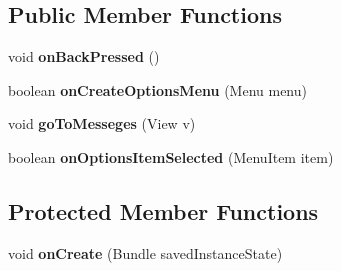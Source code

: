 \subsection*{Public Member Functions}
\begin{DoxyCompactItemize}
\item 
void {\bfseries on\+Back\+Pressed} ()\hypertarget{classcom_1_1example_1_1sebastian_1_1tindertp_1_1InfomationActivity_ab8a3f7b3ac582dfd16b4664f78bfc734}{}\label{classcom_1_1example_1_1sebastian_1_1tindertp_1_1InfomationActivity_ab8a3f7b3ac582dfd16b4664f78bfc734}

\item 
boolean {\bfseries on\+Create\+Options\+Menu} (Menu menu)\hypertarget{classcom_1_1example_1_1sebastian_1_1tindertp_1_1InfomationActivity_aedbe86e416c8e9794e9e3e908f78d393}{}\label{classcom_1_1example_1_1sebastian_1_1tindertp_1_1InfomationActivity_aedbe86e416c8e9794e9e3e908f78d393}

\item 
void {\bfseries go\+To\+Messeges} (View v)\hypertarget{classcom_1_1example_1_1sebastian_1_1tindertp_1_1InfomationActivity_a6b267eda4540054394f78638f6be1d45}{}\label{classcom_1_1example_1_1sebastian_1_1tindertp_1_1InfomationActivity_a6b267eda4540054394f78638f6be1d45}

\item 
boolean {\bfseries on\+Options\+Item\+Selected} (Menu\+Item item)\hypertarget{classcom_1_1example_1_1sebastian_1_1tindertp_1_1InfomationActivity_ab5ea063b8ca5d8754bbc0cb3b769257d}{}\label{classcom_1_1example_1_1sebastian_1_1tindertp_1_1InfomationActivity_ab5ea063b8ca5d8754bbc0cb3b769257d}

\end{DoxyCompactItemize}
\subsection*{Protected Member Functions}
\begin{DoxyCompactItemize}
\item 
void {\bfseries on\+Create} (Bundle saved\+Instance\+State)\hypertarget{classcom_1_1example_1_1sebastian_1_1tindertp_1_1InfomationActivity_ac8b37892625d557aeb1b373863a2ca1e}{}\label{classcom_1_1example_1_1sebastian_1_1tindertp_1_1InfomationActivity_ac8b37892625d557aeb1b373863a2ca1e}

\end{DoxyCompactItemize}
